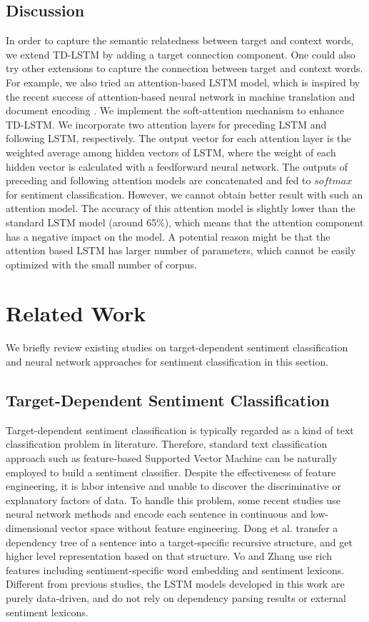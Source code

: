 \documentclass[11pt]{article}
\begin{document}
\subsection{Discussion}
In order to capture the semantic relatedness between target and context words, we extend TD-LSTM by adding a target connection component. One could also try other extensions to capture the connection between target and context words. For example, we also tried an attention-based LSTM model, which is inspired by the recent success of attention-based neural network in machine
translation \cite{Bahdanau2015} and document encoding \cite{Li2015}. 
We implement the soft-attention mechanism \cite{Bahdanau2015} to enhance TD-LSTM.
We incorporate two attention layers for preceding LSTM and following LSTM, respectively.
The output vector for each attention layer is the weighted average among hidden vectors of LSTM, 
where the weight of each hidden vector is calculated with a feedforward neural network.
The outputs of preceding and following attention models are concatenated and fed to $softmax$ for sentiment classification.
However, we cannot obtain better result with such an attention model. The accuracy of this attention model is slightly lower than the standard LSTM model (around 65\%), which means that the attention component has a negative impact on the model. 
A potential reason might be that the attention based LSTM has larger number of parameters, which cannot be easily optimized with the small number of corpus. 


\section{Related Work}
We briefly review existing studies on target-dependent sentiment classification and neural network approaches for sentiment classification in this section. 

\subsection{Target-Dependent Sentiment Classification}


Target-dependent sentiment classification is typically regarded as a kind of text classification problem in literature.
Therefore, standard text classification approach such as feature-based Supported Vector Machine \cite{Pang2002,Jiang2011} can be naturally employed to build a sentiment classifier.
Despite the effectiveness of feature engineering, it is labor intensive and unable to discover the discriminative or explanatory factors of data. 
To handle this problem, some recent studies \cite{Dong2014a,Vo2015} use neural network methods and encode each sentence in continuous and low-dimensional vector space without feature engineering. 
Dong et al.  transfer a dependency tree of a sentence into a target-specific recursive structure, and get higher level representation based on that structure.
Vo and Zhang  use rich features including sentiment-specific word embedding and sentiment lexicons.
Different from previous studies, the LSTM models developed in this work are purely data-driven, and do not rely on dependency parsing results or external sentiment lexicons. 
\end{document}
